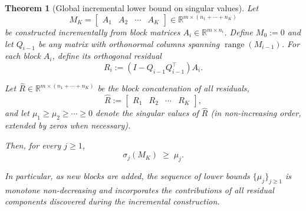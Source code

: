 \documentclass[10pt]{article} %
\newtheorem{theorem}{Theorem}
\begin{document}
\begin{theorem}[Global incremental lower bound on singular values]
\label{thm:global-incremental-lower-bound}
Let
\[
  M_K = 
  \begin{bmatrix}
    A_1 & A_2 & \cdots & A_K
  \end{bmatrix}
  \in\mathbb{R}^{m\times (n_1+\cdots+n_K)}
\]
be constructed incrementally from block matrices 
$A_i\in\mathbb{R}^{m\times n_i}$.  
Define $M_0:=0$ and let $Q_{i-1}$ be any matrix with orthonormal columns
spanning $\operatorname{range}(M_{i-1})$.
For each block $A_i$, define its orthogonal residual
\[
  R_i := (I - Q_{i-1}Q_{i-1}^\top) A_i.
\]

Let $\widehat{R}\in\mathbb{R}^{m\times (n_1+\cdots+n_K)}$ be the block
concatenation of all residuals,
\[
  \widehat{R} :=
  \begin{bmatrix}
    R_1 & R_2 & \cdots & R_K
  \end{bmatrix},
\]
and let $\mu_1\ge \mu_2\ge\cdots\ge 0$ denote the singular values of
$\widehat{R}$ (in non-increasing order, extended by zeros when necessary).

Then, for every $j\ge 1$,
\[
  \sigma_j(M_K) \;\ge\; \mu_j.
\]

In particular, as new blocks are added, the sequence of lower bounds
$\{\mu_j\}_{j\ge 1}$ is monotone non-decreasing and incorporates the
contributions of all residual components discovered during the incremental
construction.
\end{theorem}

\end{document}
